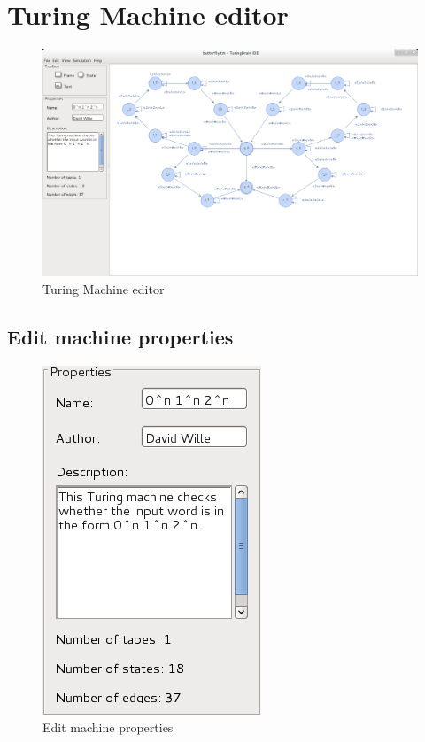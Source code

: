 \documentclass[%
  a4paper,%
  11pt,%
  blue,%
  hyperref	%
  ]{tubsartcl}
\begin{document}
\newpage

\section{Turing Machine editor}

\begin{figure}[!htb]
\begin{center}
\includegraphics[scale=0.3]{graphics_gui/turing_editor.png}
\end{center}
\caption{Turing Machine editor}
\label{pic:turing_editor}
\end{figure}

\newpage

\subsection{Edit machine properties}
\label{sec:edit-mach-prop}

\begin{figure}[!htb]
\begin{center}
\includegraphics[scale=0.5]{graphics_gui/machine_properties.png}
\end{center}
\caption{Edit machine properties}
\label{pic:machine_properties}
\end{figure}
\end{document}
